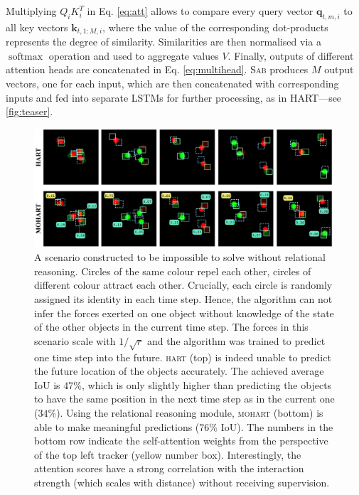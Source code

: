Multiplying $Q_iK_i^T$ in Eq. \ref{eq:att} allows to compare every query vector $\mathbf{q}_{t,m,i}$ to all key vectors $\mathbf{k}_{t,1:M,i}$, where the value of the corresponding dot-products represents the degree of similarity.
Similarities are then normalised via a $\operatorname{softmax}$ operation and used to aggregate values $V$.
Finally, outputs of different attention heads are concatenated in Eq. \ref{eq:multihead}.
\textsc{Sab} produces $M$ output vectors, one for each input, which are then concatenated with corresponding inputs and fed into separate \gls{LSTM}s for further processing, as in \gls{HART}---see \cref{fig:teaser}.


\begin{figure}[t!]%
	\centering
	\includegraphics[width=0.99\textwidth]{figures/MOHART/mot_proel.pdf}
	\caption{
		A scenario constructed to be impossible to solve without relational reasoning. Circles of the same colour repel each other, circles of different colour attract each other. Crucially, each circle is randomly assigned its identity in each time step. Hence, the algorithm can not infer the forces exerted on one object without knowledge of the state of the other objects in the current time step. The forces in this scenario scale with $1/\sqrt{r}$ and the algorithm was trained to predict one time step into the future. \textsc{hart} (top) is indeed unable to predict the future location of the objects accurately. The achieved average IoU is $47\%$, which is only slightly higher than predicting the objects to have the same position in the next time step as in the current one ($34\%$). Using the relational reasoning module, \textsc{mohart} (bottom) is able to make meaningful predictions ($76\%$ IoU). The numbers in the bottom row indicate the self-attention weights from the perspective of the top left tracker (yellow number box). Interestingly, the attention scores have a strong correlation with the interaction strength (which scales with distance) without receiving supervision.
		\vspace{-3mm}
	}
	\label{fig:toy2}
\end{figure}


